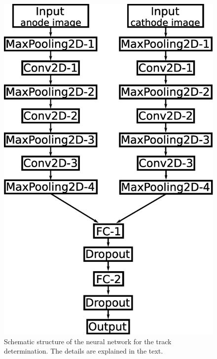 \documentclass{jps-cp}
\begin{document}
\begin{figure}
\begin{minipage}{0.4\columnwidth}
    \includegraphics[clip, width=0.9\columnwidth]{eps/point_detection_v2.eps}
    \caption{Schematic structure of the neural network for the track determination.
      The details are explained in the text.}
    \label{fig:extraction}
  \end{minipage}
\end{figure}
\end{document}
